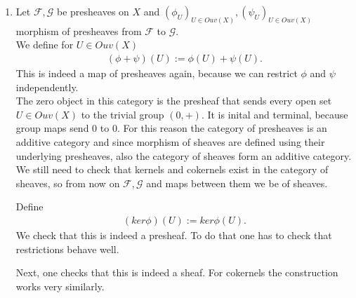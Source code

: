 \begin{exercise}{3}
    \begin{enumerate}
        \item{Let $\mathcal{F}, \mathcal{G}$ be presheaves on $X$ and
            $(\phi_U)_{U\in Ouv(X)}, (\psi_U)_{U\in Ouv(X)}$ morphism of
            presheaves from $\mathcal{F}$ to $\mathcal{G}$.\\ We define for
            $U\in Ouv(X)$
            \begin{align*}
                (\phi+\psi)(U):=\phi(U)+\psi(U).
            \end{align*}
            This is indeed a map of presheaves again, because we can restrict
            $\phi$ and $\psi$ independently.\\ The zero object in this category
            is the presheaf that sends every open set $U\in Ouv(X)$ to the
            trivial group $(0,+)$. It is inital and terminal, because group maps
            send $0$ to $0$. For this reason the category of presheaves is an
            additive category and since morphism of sheaves are defined using
            their underlying presheaves, also the category of sheaves form an
            additive category.\\ We still need to check that kernels and
            cokernels exist in the category of sheaves, so from now on
            $\mathcal{F},\mathcal{G}$ and maps between them we be of sheaves.

            Define 
            \begin{align*}
                (ker\phi)(U):=ker\phi(U).
            \end{align*}
            We check that this is indeed a presheaf. To do that one has to check
            that restrictions behave well.

            Next, one checks that this is indeed a sheaf. For cokernels the construction
            works very similarly.

}
\end{enumerate}
\end{exercise}
